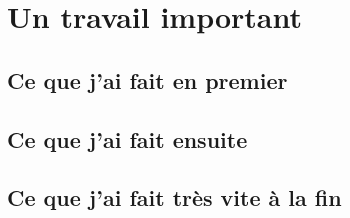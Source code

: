 \chapter{Un travail important}
\minitoc

\section{Ce que j'ai fait en premier}
\blindtext[10]


\section{Ce que j'ai fait ensuite}
\blindtext[10]

\section{Ce que j'ai fait très vite à la fin}
\blindtext[10]